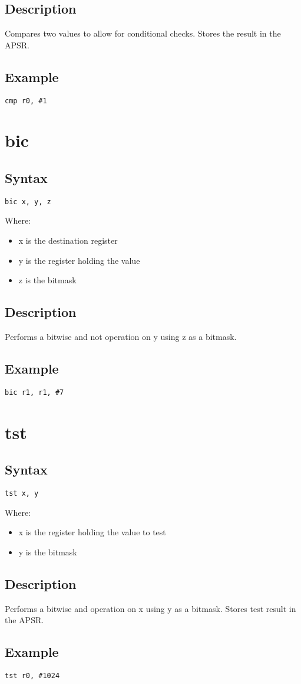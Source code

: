 \documentclass[11pt]{scrartcl}
\begin{document}
\subsection{Description}
Compares two values to allow for conditional checks. Stores the result in
the APSR.
\subsection{Example}
\begin{verbatim}
cmp r0, #1
\end{verbatim}

\section{bic}
\subsection{Syntax}
\begin{verbatim}
bic x, y, z
\end{verbatim}
Where:
\begin{itemize}
    \item x is the destination register
    \item y is the register holding the value
    \item z is the bitmask
\end{itemize}
\subsection{Description}
Performs a bitwise and not operation on y using z as a bitmask.
\subsection{Example}
\begin{verbatim}
bic r1, r1, #7
\end{verbatim}

\section{tst}
\subsection{Syntax}
\begin{verbatim}
tst x, y
\end{verbatim}
Where:
\begin{itemize}
    \item x is the register holding the value to test
    \item y is the bitmask
\end{itemize}
\subsection{Description}
Performs a bitwise and operation on x using y as a bitmask. Stores test
result in the APSR.
\subsection{Example}
\begin{verbatim}
tst r0, #1024
\end{verbatim}
\end{document}
